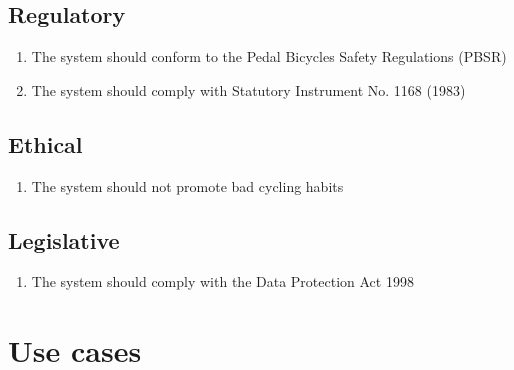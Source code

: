 \documentclass[a4paper]{report}
\begin{document}
\subsection{Regulatory}
\label{regulatory}
\begin{enumerate}[label=\ref*{regulatory}.\arabic*.,leftmargin=*]
\item The system should conform to the Pedal Bicycles Safety Regulations (PBSR)
\item The system should comply with Statutory Instrument No. 1168 (1983)
\end{enumerate}
\subsection{Ethical}
\label{ethical}
\begin{enumerate}[label=\ref*{ethical}.\arabic*.,leftmargin=*]
\item The system should not promote bad cycling habits
\end{enumerate}
\subsection{Legislative}
\label{legislative}
\begin{enumerate}[label=\ref*{legislative}.\arabic*.,leftmargin=*]
\item The system should comply with the Data Protection Act 1998
\end{enumerate}

\section{Use cases}
\label{sec:use-cases}
\end{document}
